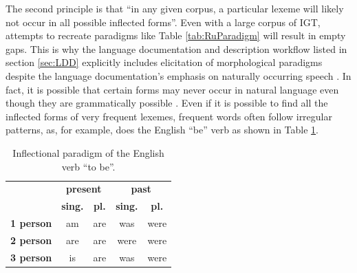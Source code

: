 The second principle is that ``in any given corpus, a particular lexeme will likely not occur in all possible inflected forms''.  Even with a large corpus of IGT, attempts to recreate paradigms like Table \ref{tab:RuParadigm} will result in empty gaps. This is why the language documentation and description workflow listed in section \ref{sec:LDD} explicitly includes elicitation of morphological paradigms despite the language documentation's emphasis on naturally occurring speech \citep{lupke_data_2010,boerger_language_2016}. In fact, it is possible that certain forms may never occur in natural language even though they are grammatically possible \citep{silfverberg_encoder-decoder_2018}. Even if it is possible to find all the inflected forms of very frequent lexemes, frequent words often follow irregular patterns, as, for example, does the English ``be'' verb as shown in Table \ref{tab:EngParadigm}. 

\begin{table}[h!]
    \begin{center}
    \begin{tabular}{l|c|c|c|c}
      & \multicolumn{2}{c}{\textbf{present}} & \multicolumn{2}{|c}{\textbf{past}} \\
      \cline{2-5}
       & \textbf{sing.}  & \textbf{pl.} & \textbf{sing.}  & \textbf{pl.} \\
       \hline
      \textbf{1 person}  & am & are & was & were \\
      \textbf{2 person} & are & are  & were & were  \\
      \textbf{3 person} & is & are & was & were \\
    \end{tabular}
    \caption[Inflectional paradigm of the English verb ``to be'']{Inflectional paradigm of the English verb ``to be''. 
    }
    \label{tab:EngParadigm}
    \end{center}
\end{table}